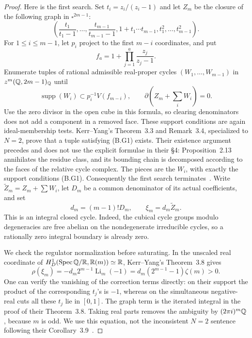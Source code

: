 \begin{proof}
Here is the first search.  Set \(t_i=z_i/(z_i-1)\) and let \(Z_m\)
be the closure of the following graph in \(\square^{2m-1}\):
\[
 \left(
 \frac{t_1}{t_1-1},\ldots,\frac{t_{m-1}}{t_{m-1}-1},
 1+t_1\cdots t_{m-1},t_1^2,\ldots,t_{m-1}^2
 \right).
\]
For \(1\le i\le m-1\), let \(p_i\) project to the first
\(m-i\) coordinates, and put
\[
 f_a=1+\prod_{j=1}^a\frac{z_j}{z_j-1}.
\]
Enumerate tuples of rational admissible real-proper cycles
\((W_1,\ldots,W_{m-1})\) in \(z^m(\mathbb Q,2m-1)_\mathbb Q\)
until
\[
 \operatorname{supp}(W_i)\subset p_i^{-1}V(f_{m-i}),
 \qquad
 \partial\left(Z_m+\sum_iW_i\right)=0.
\tag{B.G1}
\]
Use the zero divisor in the open cube in this formula, so clearing
denominators does not add a component in a removed face.  These support
conditions are again ideal-membership tests.  Kerr--Yang's
Theorem~3.3 and Remark~3.4, specialized to \(N=2\), prove that a
tuple satisfying (B.G1) exists.  Their existence argument precedes and
does not use the explicit formulae in their \S4: Proposition~2.13
annihilates the residue class, and its bounding chain is decomposed
according to the faces of the relative cycle complex.  The pieces are
the \(W_i\), with exactly the support conditions (B.G1).
Consequently the first search terminates~\cite[Theorem~3.3 and Remark~3.4]{BKerrYang2018}.  Write
\(\widetilde Z_m=Z_m+\sum W_i\), let \(D_m\) be a common
denominator of its actual coefficients, and set
\[
 d_m=(m-1)!D_m,\qquad \xi_m=d_m\widetilde Z_m.
\tag{B.G2}
\]
This is an integral closed cycle.  Indeed, the cubical cycle groups
modulo degeneracies are free abelian on the nondegenerate irreducible
cycles, so a rationally zero integral boundary is already zero.

We check the regulator normalization before saturating.  In the
unscaled real coordinate of
\(H^1_D(\operatorname{Spec}\mathbb Q/\mathbb R,\mathbb R(m))\simeq\mathbb R\), Kerr--Yang's
Theorem~3.8 gives
\[
 \rho(\xi_m)
 =-d_m2^{m-1}\operatorname{Li}_m(-1)
 =d_m(2^{m-1}-1)\zeta(m)>0.
\tag{B.G3}
\]
One can verify the vanishing of the correction terms directly: on
their support the product of the corresponding \(t_j\)'s is
\(-1\), whereas on the simultaneous negative-real cuts all these
\(t_j\) lie in \([0,1]\).  The graph term is the iterated
integral in the proof of their Theorem~3.8.  Taking real parts removes
the ambiguity by \((2\pi i)^m\mathbb Q\), because \(m\) is odd.
We use this equation, not the inconsistent \(N=2\) sentence following
their Corollary~3.9~\cite[Theorem~3.8]{BKerrYang2018}.


\end{proof}
